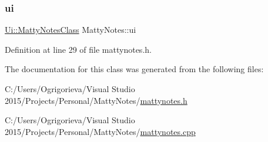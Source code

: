 \subsubsection{\texorpdfstring{ui}{ui}}
{\footnotesize\ttfamily \hyperlink{classUi_1_1MattyNotesClass}{Ui\+::\+Matty\+Notes\+Class} Matty\+Notes\+::ui\hspace{0.3cm}{\ttfamily [private]}}



Definition at line 29 of file mattynotes.\+h.



The documentation for this class was generated from the following files\+:\begin{DoxyCompactItemize}
\item 
C\+:/\+Users/\+Ogrigorieva/\+Visual Studio 2015/\+Projects/\+Personal/\+Matty\+Notes/\hyperlink{mattynotes_8h}{mattynotes.\+h}\item 
C\+:/\+Users/\+Ogrigorieva/\+Visual Studio 2015/\+Projects/\+Personal/\+Matty\+Notes/\hyperlink{mattynotes_8cpp}{mattynotes.\+cpp}\end{DoxyCompactItemize}
